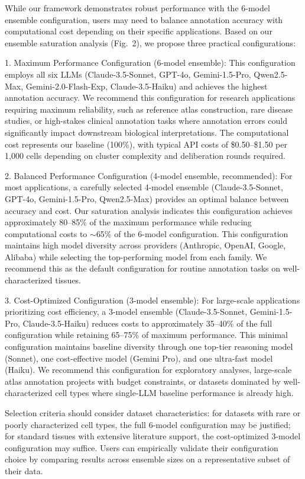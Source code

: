 \documentclass[pdflatex,sn-nature]{sn-jnl}%
\theoremstyle{thmstyleone}%
\theoremstyle{thmstyletwo}%
\theoremstyle{thmstylethree}%
\begin{document}
While our framework demonstrates robust performance with the 6-model ensemble configuration, users may need to balance annotation accuracy with computational cost depending on their specific applications. Based on our ensemble saturation analysis (Fig.~2), we propose three practical configurations:

1. Maximum Performance Configuration (6-model ensemble):
This configuration employs all six LLMs (Claude-3.5-Sonnet, GPT-4o, Gemini-1.5-Pro, Qwen2.5-Max, Gemini-2.0-Flash-Exp, Claude-3.5-Haiku) and achieves the highest annotation accuracy. We recommend this configuration for research applications requiring maximum reliability, such as reference atlas construction, rare disease studies, or high-stakes clinical annotation tasks where annotation errors could significantly impact downstream biological interpretations. The computational cost represents our baseline (100\%), with typical API costs of \$0.50--\$1.50 per 1,000 cells depending on cluster complexity and deliberation rounds required.

2. Balanced Performance Configuration (4-model ensemble, recommended):
For most applications, a carefully selected 4-model ensemble (Claude-3.5-Sonnet, GPT-4o, Gemini-1.5-Pro, Qwen2.5-Max) provides an optimal balance between accuracy and cost. Our saturation analysis indicates this configuration achieves approximately 80--85\% of the maximum performance while reducing computational costs to $\sim$65\% of the 6-model configuration. This configuration maintains high model diversity across providers (Anthropic, OpenAI, Google, Alibaba) while selecting the top-performing model from each family. We recommend this as the default configuration for routine annotation tasks on well-characterized tissues.

3. Cost-Optimized Configuration (3-model ensemble):
For large-scale applications prioritizing cost efficiency, a 3-model ensemble (Claude-3.5-Sonnet, Gemini-1.5-Pro, Claude-3.5-Haiku) reduces costs to approximately 35--40\% of the full configuration while retaining 65--75\% of maximum performance. This minimal configuration maintains baseline diversity through one top-tier reasoning model (Sonnet), one cost-effective model (Gemini Pro), and one ultra-fast model (Haiku). We recommend this configuration for exploratory analyses, large-scale atlas annotation projects with budget constraints, or datasets dominated by well-characterized cell types where single-LLM baseline performance is already high.

Selection criteria should consider dataset characteristics: for datasets with rare or poorly characterized cell types, the full 6-model configuration may be justified; for standard tissues with extensive literature support, the cost-optimized 3-model configuration may suffice. Users can empirically validate their configuration choice by comparing results across ensemble sizes on a representative subset of their data.
\end{document}
